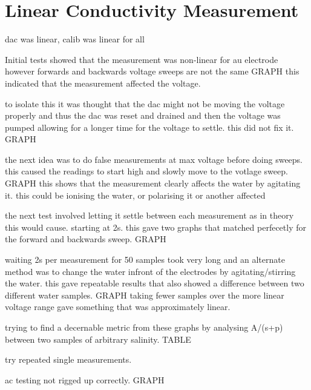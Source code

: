 \section{Linear Conductivity Measurement}\label{sec:linear-conductivity-measurement}


dac was linear, calib was linear for all

Initial tests showed that the measurement was non-linear for au electrode however forwards and backwards voltage sweeps are not the same GRAPH
this indicated that the measurement affected the voltage.

to isolate this it was thought that the dac might not be moving the voltage properly and thus the dac was reset and drained and then the voltage was pumped allowing for a longer time for the voltage to settle. 
this did not fix it. GRAPH

the next idea was to do false measurements at max voltage before doing sweeps.
this caused the readings to start high and slowly move to the votlage sweep. GRAPH
this shows that the measurement clearly affects the water by agitating it.
this could be ionising the water, or polarising it or another affected

the next test involved letting it settle between each measurement as in theory this would cause. 
starting at 2s.
this gave two graphs that matched perfecetly for the forward and backwards sweep. GRAPH

waiting 2s per measurement for 50 samples took very long and an alternate method was to change the water infront of the electrodes by agitating/stirring the water.
this gave repeatable results that also showed a difference between two different water samples. GRAPH
taking fewer samples over the more linear voltage range gave something that was approximately linear.

trying to find a decernable metric from these graphs by analysing A/(s+p) between two samples of arbitrary salinity. TABLE

try repeated single measurements.

ac testing not rigged up correctly. GRAPH